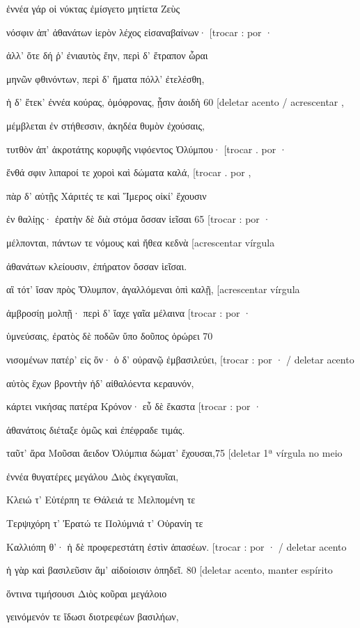 ἐννέα γάρ οἱ νύκτας ἐμίσγετο μητίετα Ζεὺς

νόσφιν ἀπ' ἀθανάτων ἱερὸν λέχος εἰσαναβαίνων· {[}trocar : por ·

ἀλλ' ὅτε δή ῥ' ἐνιαυτὸς ἔην, περὶ δ' ἔτραπον ὧραι

μηνῶν φθινόντων, περὶ δ' ἤματα πόλλ' ἐτελέσθη,

ἡ δ' ἔτεκ' ἐννέα κούρας, ὁμόφρονας, ᾗσιν ἀοιδὴ 60 {[}deletar acento /
acrescentar ,

μέμβλεται ἐν στήθεσσιν, ἀκηδέα θυμὸν ἐχούσαις,

τυτθὸν ἀπ' ἀκροτάτης κορυφῆς νιφόεντος Ὀλύμπου· {[}trocar . por ·

ἔνθά σφιν λιπαροί τε χοροὶ καὶ δώματα καλά, {[}trocar . por ,

πὰρ δ' αὐτῇς Χάριτές τε καὶ Ἵμερος οἰκί' ἔχουσιν

ἐν θαλίῃς· ἐρατὴν δὲ διὰ στόμα ὄσσαν ἱεῖσαι 65 {[}trocar : por ·

μέλπονται, πάντων τε νόμους καὶ ἤθεα κεδνὰ {[}acrescentar vírgula

ἀθανάτων κλείουσιν, ἐπήρατον ὄσσαν ἱεῖσαι.

αἳ τότ' ἴσαν πρὸς Ὄλυμπον, ἀγαλλόμεναι ὀπὶ καλῇ, {[}acrescentar vírgula

ἀμβροσίῃ μολπῇ· περὶ δ' ἴαχε γαῖα μέλαινα {[}trocar : por ·

ὑμνεύσαις, ἐρατὸς δὲ ποδῶν ὕπο δοῦπος ὀρώρει 70

νισομένων πατέρ' εἰς ὅν· ὁ δ' οὐρανῷ ἐμβασιλεύει, {[}trocar : por · /
deletar acento

αὐτὸς ἔχων βροντὴν ἠδ' αἰθαλόεντα κεραυνόν,

κάρτει νικήσας πατέρα Κρόνον· εὖ δὲ ἕκαστα {[}trocar : por ·

ἀθανάτοις διέταξε ὁμῶς καὶ ἐπέφραδε τιμάς.

ταῦτ' ἄρα Μοῦσαι ἄειδον Ὀλύμπια δώματ' ἔχουσαι,75 {[}deletar 1ª vírgula
no meio

ἐννέα θυγατέρες μεγάλου Διὸς ἐκγεγαυῖαι,

Κλειώ τ' Εὐτέρπη τε Θάλειά τε Μελπομένη τε

Τερψιχόρη τ' Ἐρατώ τε Πολύμνιά τ' Οὐρανίη τε

Καλλιόπη θ'· ἡ δὲ προφερεστάτη ἐστὶν ἁπασέων. {[}trocar : por · /
deletar acento

ἡ γὰρ καὶ βασιλεῦσιν ἅμ' αἰδοίοισιν ὀπηδεῖ. 80 {[}deletar acento, manter
espírito

ὅντινα τιμήσουσι Διὸς κοῦραι μεγάλοιο

γεινόμενόν τε ἴδωσι διοτρεφέων βασιλήων,

